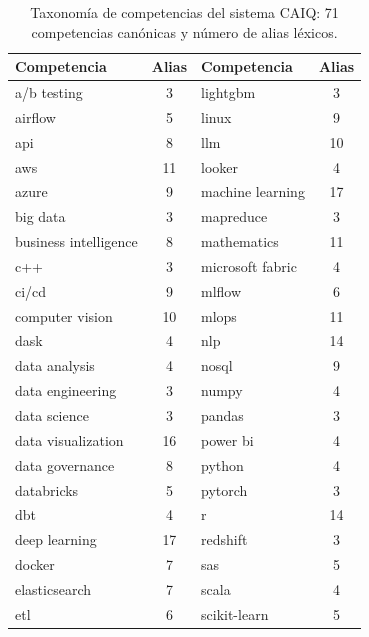 \begin{table}[H]
  \caption{Taxonomía de competencias del sistema CAIQ: 71 competencias canónicas y
  número de alias léxicos.}
  \label{tab:taxonomia_completa}
  \centering
  \footnotesize
  \begin{tabular}{|p{4.0cm}|c||p{4.0cm}|c|}
    \hline
    \rowcolor{gray!15}
    \textbf{Competencia} & \textbf{Alias} & \textbf{Competencia} & \textbf{Alias} \\
    \hline
    a/b testing         &  3 & lightgbm           &  3 \\
    airflow             &  5 & linux              &  9 \\
    api                 &  8 & llm                & 10 \\
    aws                 & 11 & looker             &  4 \\
    azure               &  9 & machine learning   & 17 \\
    big data            &  3 & mapreduce          &  3 \\
    business intelligence &  8 & mathematics      & 11 \\
    c++                 &  3 & microsoft fabric   &  4 \\
    ci/cd               &  9 & mlflow             &  6 \\
    computer vision     & 10 & mlops              & 11 \\
    dask                &  4 & nlp                & 14 \\
    data analysis       &  4 & nosql              &  9 \\
    data engineering    &  3 & numpy              &  4 \\
    data science        &  3 & pandas             &  3 \\
    data visualization  & 16 & power bi           &  4 \\
    data governance     &  8 & python             &  4 \\
    databricks          &  5 & pytorch            &  3 \\
    dbt                 &  4 & r                  & 14 \\
    deep learning       & 17 & redshift           &  3 \\
    docker              &  7 & sas                &  5 \\
    elasticsearch       &  7 & scala              &  4 \\
    etl                 &  6 & scikit-learn       &  5 \\

\end{tabular}
\end{table}
